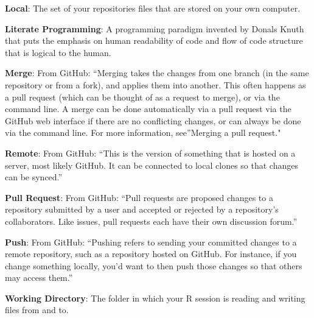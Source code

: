 \documentclass[]{book}
\begin{document}
\textbf{Local}: The set of your repositories files that are stored on
your own computer.

\textbf{Literate Programming}: A programming paradigm invented by Donals
Knuth that puts the emphasis on human readability of code and flow of
code structure that is logical to the human.

\textbf{Merge}: From GitHub: ``Merging takes the changes from one branch
(in the same repository or from a fork), and applies them into another.
This often happens as a pull request (which can be thought of as a
request to merge), or via the command line. A merge can be done
automatically via a pull request via the GitHub web interface if there
are no conflicting changes, or can always be done via the command line.
For more information, see''Merging a pull request."

\textbf{Remote}: From GitHub: ``This is the version of something that is
hosted on a server, most likely GitHub. It can be connected to local
clones so that changes can be synced.''

\textbf{Pull Request}: From GitHub: ``Pull requests are proposed changes
to a repository submitted by a user and accepted or rejected by a
repository's collaborators. Like issues, pull requests each have their
own discussion forum.''

\textbf{Push}: From GitHub: ``Pushing refers to sending your committed
changes to a remote repository, such as a repository hosted on GitHub.
For instance, if you change something locally, you'd want to then push
those changes so that others may access them.''

\textbf{Working Directory}: The folder in which your R session is
reading and writing files from and to.
\end{document}
